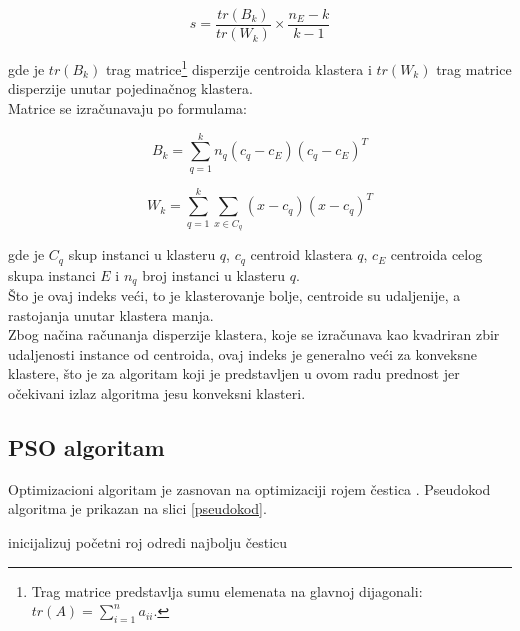 \documentclass[a4paper, twocolumn]{article}
\begin{document}
{\[ s = \frac{tr(B_k)}{tr(W_k)} \times \frac{n_E - k}{k - 1} \]

gde je $tr(B_k)$ trag matrice\footnote{Trag matrice predstavlja sumu elemenata na glavnoj dijagonali: $tr(A) = \sum_{i=1}^{n}a_{ii}$.} disperzije centroida klastera i $tr(W_k)$ trag matrice disperzije unutar pojedinačnog klastera.\\

Matrice se izračunavaju po formulama:

\[ B_k = \sum_{q=1}^{k} n_q(c_q - c_E)(c_q - c_E)^T \] 

\[ W_k = \sum_{q=1}^{k}\sum_{x \in C_q}(x - c_q)(x - c_q)^T \]

gde je $C_q$ skup instanci u klasteru $q$, $c_q$ centroid klastera $q$, $c_E$  centroida celog skupa instanci $E$ i $n_q$ broj instanci u klasteru $q$.\\

Što je ovaj indeks veći, to je klasterovanje bolje, centroide su udaljenije, a rastojanja unutar klastera manja.\\
Zbog načina računanja disperzije klastera, koje se izračunava kao kvadriran zbir udaljenosti instance od centroida, ovaj indeks je generalno veći za konveksne klastere, što je za algoritam koji je predstavljen u ovom radu prednost jer očekivani izlaz algoritma jesu konveksni klasteri.

\subsection{PSO algoritam}
\label{sec:algoritam}
Optimizacioni algoritam je zasnovan na optimizaciji rojem čestica \cite{pso}.
Pseudokod algoritma je prikazan na slici \ref{pseudokod}.
\begin{algorithm}
\SetAlgoLined
{}
 inicijalizuj početni roj\;
 odredi najbolju česticu\;
 

\end{algorithm}}
\end{document}
